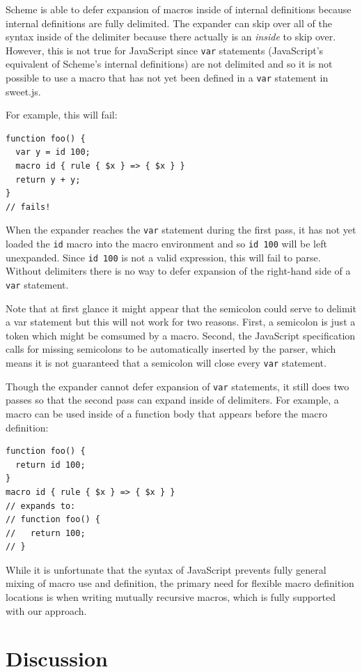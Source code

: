 \documentclass[preprint,10pt]{sigplanconf}
\begin{document}
Scheme is able to defer expansion of macros inside of internal
definitions because internal definitions are fully delimited. The
expander can skip over all of the syntax inside of the delimiter
because there actually is an \emph{inside} to skip over. However, this
is not true for JavaScript since \verb!var! statements
(JavaScript's equivalent of Scheme's internal definitions) are not
delimited and so it is not possible to use a macro that has not yet
been defined in a \verb!var! statement in sweet.js.

For example, this will fail:

\begin{lstlisting}
function foo() {
  var y = id 100;
  macro id { rule { $x } => { $x } }
  return y + y;
}
// fails!
\end{lstlisting}
When the expander reaches the \verb!var! statement during the
first pass, it has not yet loaded the \verb!id! macro into the
macro environment and so \verb!id 100! will be left unexpanded.
Since \verb!id 100! is not a valid expression, this will fail to
parse.
Without delimiters there is no way to defer expansion of the
right-hand side of a \verb!var! statement.

Note that at first glance it might appear that the semicolon could
serve to delimit a var statement but this will not work for two
reasons. First, a semicolon is just a token which might be comsumed by
a macro. Second, the JavaScript specification calls for missing
semicolons to be automatically inserted by the parser, which means
it is not guaranteed that a semicolon will close every \verb!var!
statement.

Though the expander cannot defer expansion of \verb!var!
statements, it still does two passes so that
the second pass can expand inside of delimiters. For example, a macro
can be used inside of a function body that appears before the macro definition:
\begin{lstlisting}
function foo() {
  return id 100;
}
macro id { rule { $x } => { $x } }
// expands to:
// function foo() {
//   return 100;
// }
\end{lstlisting}


While it is unfortunate that the syntax of JavaScript prevents fully
general mixing of macro use and definition, the primary need for
flexible macro definition locations is when writing mutually recursive
macros, which is fully supported with our approach.

\section{Discussion}
\end{document}
